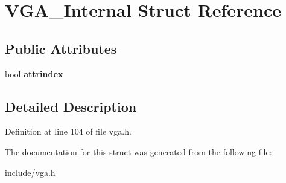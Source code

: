 \hypertarget{structVGA__Internal}{\section{V\-G\-A\-\_\-\-Internal Struct Reference}
\label{structVGA__Internal}
}
\subsection*{Public Attributes}
\begin{DoxyCompactItemize}
\item 
\hypertarget{structVGA__Internal_a36feb3e3abbf2c0f50f3fbe45ad763aa}{bool {\bfseries attrindex}}\label{structVGA__Internal_a36feb3e3abbf2c0f50f3fbe45ad763aa}

\end{DoxyCompactItemize}


\subsection{Detailed Description}


Definition at line 104 of file vga.\-h.



The documentation for this struct was generated from the following file\-:\begin{DoxyCompactItemize}
\item 
include/vga.\-h\end{DoxyCompactItemize}
